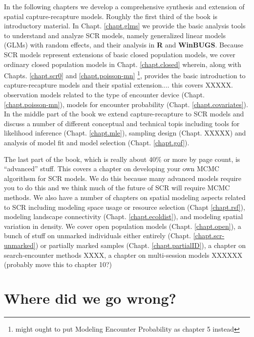 In the following chapters we develop a comprehensive synthesis and
extension of spatial capture-recapture models.  Roughly the first
third of the book is introductory material. In Chapt. \ref{chapt.glms}
we provide the basic analysis tools to understand and analyze SCR
models, namely generalized linear models (GLMs) with random effects,
and their analysis in {\bf R} and {\bf WinBUGS}.  Because SCR models
represent extensions of basic closed population models, we cover
ordinary closed population models in Chapt. \ref{chapt.closed}
wherein, along with Chapts. \ref{chapt.scr0} and
\ref{chapt.poisson-mn} \footnote{might ought to put Modeling Encounter
  Probability as chapter 5 instead}, provides the basic introduction
to capture-recapture models and their spatial extension.... this
covers XXXXX.  observation models related to the type of encounter
device (Chapt. \ref{chapt.poisson-mn}), models for encounter
probability (Chapt. \ref{chapt.covariates}). In the middle part of the
book we extend capture-recapture to SCR models and discuss a number of
different conceptual and technical topis including tools for
likelihood inference (Chapt. \ref{chapt.mle}), sampling design
(Chapt. XXXXX) and analysis of model fit and model selection
(Chapt. \ref{chapt.gof}).

The last part of the book, which is really about 40\% or more by page
count, is ``advanced'' stuff. This covers a chapter on developing your
own MCMC algorithsm for SCR models. We do this because many advanced
models require you to do this and we think much of the future of SCR
will require MCMC methods.  We also have a number of chapters on
spatial modeling aspects related to SCR including modeling space usage
or resource selection (Chapt \ref{chapt.rsf}), modeling landscape
connectivity (Chapt. \ref{chapt.ecoldist}), and modeling spatial
variation in density.  We cover open population models
(Chapt. \ref{chapt.open}), a bunch of stuff on unmarked individuals
either entirely (Chapt. \ref{chapt.scr-unmarked}) or partially marked
samples (Chapt. \ref{chapt.partialID}), a chapter on search-encounter
methods XXXX, a chapter on multi-session models XXXXXX (probably move
this to chapter 10?)

















\section*{Where did we go wrong?}

